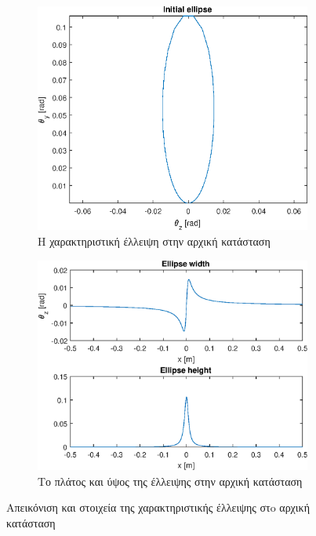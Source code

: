 \begin{figure}[tph]	
	\begin{subfigure}{0.47\textwidth}
		\includegraphics[width=\linewidth]{figures/MATLAB-variable-analysis/initial-ellipse}
		\centering
		\caption{Η χαρακτηριστική έλλειψη στην αρχική κατάσταση}
		\label{fig:MATLAB-variable-analysis-initial-ellipse}
	\end{subfigure}
	\hfill
	\begin{subfigure}{0.47\textwidth}
		\includegraphics[width=\linewidth]{figures/MATLAB-variable-analysis/initial-ellipse-height-width}
		\centering
		\caption{Το πλάτος και ύψος της έλλειψης στην αρχική κατάσταση}
		\label{fig:MATLAB-variable-analysis-initial-ellipse-height-width}
	\end{subfigure}
\caption{Απεικόνιση και στοιχεία της χαρακτηριστικής έλλειψης στo αρχική κατάσταση}
\label{fig:initial-ellipse}
\end{figure}

